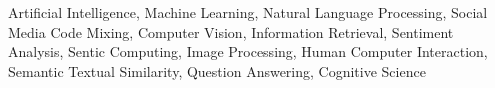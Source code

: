 {Artificial Intelligence, Machine Learning, Natural Language Processing, Social Media Code Mixing, Computer Vision,  Information Retrieval, Sentiment Analysis, Sentic Computing, Image Processing, Human Computer Interaction, Semantic Textual Similarity, Question Answering, Cognitive Science}
